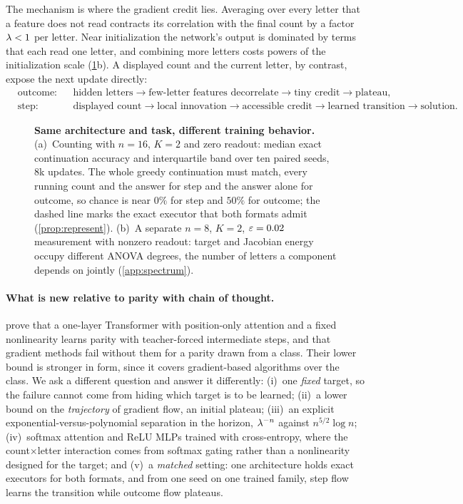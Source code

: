 The mechanism is where the gradient credit lies. Averaging over every letter that a feature does not read contracts its correlation with
the final count by a factor $\lambda<1$ per letter. Near initialization the network's output is dominated by terms that each read one
letter, and combining more letters costs powers of the initialization scale (\cref{fig:overview}b). A displayed count and the current
letter, by contrast, expose the next update directly:
{\small
\[
\begin{aligned}
 &\text{outcome:}&&\text{hidden letters}\to\text{few-letter features decorrelate}\to\text{tiny credit}\to\text{plateau},\\
 &\text{step:}&&\text{displayed count}\to\text{local innovation}\to\text{accessible credit}\to\text{learned transition}\to\text{solution}.
\end{aligned}
\]
}

\begin{figure}[t]
\centering

\caption{\textbf{Same architecture and task, different training behavior.}
(a)~Counting with $n=16$, $K=2$ and zero readout: median exact continuation accuracy and interquartile band over ten paired seeds, $8$k
updates. The whole greedy continuation must match, every running count and the answer for step and the answer alone for outcome,
so chance is near $0\%$ for step and $50\%$ for outcome; the dashed line marks the exact executor that both formats admit (\cref{prop:represent}).
(b)~A separate $n=8$, $K=2$, $\varepsilon=0.02$ measurement with nonzero readout: target and Jacobian energy occupy different ANOVA degrees, the number of letters a component depends on jointly (\cref{app:spectrum}).}
\label{fig:overview}
\end{figure}

\paragraph{What is new relative to parity with chain of thought.} \citet{kim2024parity} prove that a one-layer Transformer with
position-only attention and a fixed nonlinearity learns parity with teacher-forced intermediate steps, and that gradient methods fail
without them for a parity drawn from a class. Their lower bound is stronger in form, since it covers gradient-based algorithms over the
class. We ask a different question and answer it differently: (i)~one \emph{fixed} target, so the failure cannot come from hiding which
target is to be learned; (ii)~a lower bound on the \emph{trajectory} of gradient flow, an initial plateau; (iii)~an explicit
exponential-versus-polynomial separation in the horizon, $\lambda^{-n}$ against $n^{5/2}\log n$; (iv)~softmax attention and ReLU MLPs
trained with cross-entropy, where the count$\times$letter interaction comes from softmax gating rather than a nonlinearity designed
for the target; and (v)~a \emph{matched} setting: one architecture holds exact executors for both formats, and from one seed on one trained
family, step flow learns the transition while outcome flow plateaus.

